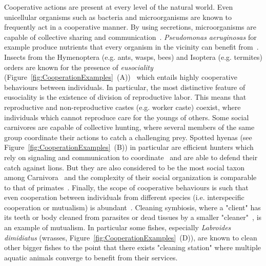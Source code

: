     Cooperative actions are present at every level of the natural world. Even unicellular organisms such as bacteria and microorganisms are known to frequently act in a cooperative manner. By using secretions, microorganisms are capable of collective sharing and communication~\parencite{Elena2003, Keller2006, West2006}. \emph{Pseudomonas aeruginosas} for example produce nutrients that every organism in the vicinity can benefit from~\parencite{Popat2012, Harrison2013}. Insects from the Hymenoptera (e.g. ants, wasps, bees) and Isoptera (e.g. termites) orders are known for the presence of \emph{eusociality} (Figure~\ref{fig:CooperationExamples}~(A))~\parencite{Wilson1990} which entails highly cooperative behaviours between individuals. In particular, the most distinctive feature of eusociality is the existence of division of reproductive labor. This means that reproductive and non-reproductive castes (e.g. worker caste) coexist, where individuals which cannot reproduce care for the youngs of others. Some social carnivores are capable of collective hunting, where several members of the same group coordinate their actions to catch a challenging prey. Spotted hyenas (see Figure~\ref{fig:CooperationExamples}~(B)) in particular are efficient hunters which rely on signaling and communication to coordinate~\parencite{Drea2009a, Smith2010, Smith2012a} and are able to defend their catch against lions. But they are also considered to be the most social taxon among Carnivora~\parencite{Mills2003} and the complexity of their social organization is comparable to that of primates~\parencite{Drea2003}. Finally, the scope of cooperative behaviours is such that even cooperation between individuals from different species (i.e. interspecific cooperation or mutualism) is abundant~\parencite{Bshary2004}. Cleaning symbiosis, where a "client" has its teeth or body cleaned from parasites or dead tissues by a smaller "cleaner"~\parencite{Poulin1996}, is an example of mutualism. In particular some fishes, especially \emph{Labroides dimidiatus} (wrasses, Figure~\ref{fig:CooperationExamples}~(D)), are known to clean other bigger fishes to the point that there exists "cleaning station" where multiple aquatic animals converge to benefit from their services.


